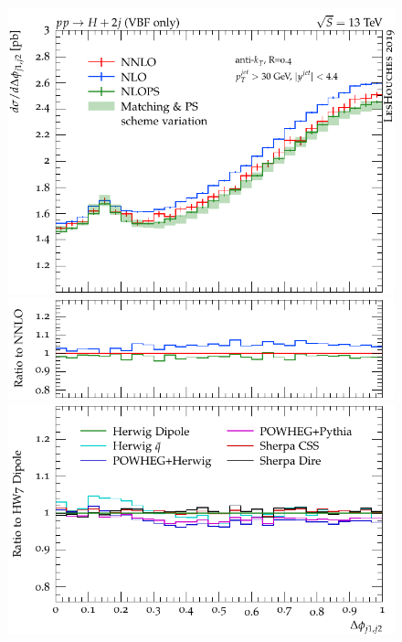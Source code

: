 \documentclass[10pt,prd,fleqn,superscriptaddress,notitlepage,nofootinbib,preprintnumbers,nobalancelastpage]{revtex4-1}
\begin{document}
\begin{figure}[tp]
  \centering
  \begin{minipage}{.32\textwidth}
    \includegraphics[width=\textwidth]{figures/tools/delta_phi_jj12.pdf}
    \includegraphics[width=\textwidth]{figures/tools/delta_phi_jj12_rFO.pdf}
    \includegraphics[width=\textwidth]{figures/tools/delta_phi_jj12_rMC.pdf}
  \end{minipage}\hfill
  \begin{minipage}{.32\textwidth}

\end{minipage}
\end{figure}
\end{document}
